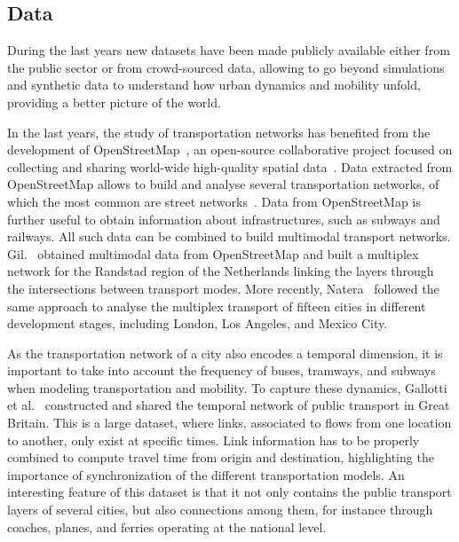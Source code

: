 \subsection{Data}
During the last years new datasets have been made publicly available either from the public sector or from crowd-sourced data, allowing to go beyond simulations and synthetic data to understand how urban dynamics and mobility unfold, providing a better picture of the world.

In the last years, the study of transportation networks has benefited from the development of OpenStreetMap~\cite{OpenStreetMap}, an open-source collaborative project focused on collecting and sharing world-wide high-quality spatial data~\cite{haklay2010openstreetmap,girres2010quality,ferster2019openstreetmap,barbosa2018human}. Data extracted from OpenStreetMap allows to build and analyse several transportation networks, of which the most common are street networks~\cite{boeing2020multiscale,boeing2020world}. Data from OpenStreetMap is further useful to obtain information about infrastructures, such as subways and railways. All such data can be combined to build multimodal transport networks. Gil.~\cite{gil2015multimodal} obtained multimodal data from OpenStreetMap and built a multiplex network for the Randstad region of the Netherlands linking the layers through the intersections between transport modes. More recently, Natera~\cite{natera2019data} followed the same approach to analyse the multiplex transport of fifteen cities in different development stages, including London, Los Angeles, and Mexico City.

As the transportation network of a city also encodes a temporal dimension, it is important to take into account the frequency of buses, tramways, and subways when modeling transportation and mobility. To capture these dynamics, Gallotti et al.~\cite{gallotti2015temporal} constructed and shared the temporal network of public transport in Great Britain. This is a large dataset, where links, associated to flows from one location to another, only exist at specific times. Link information has to be properly combined to compute travel time from origin and destination, highlighting the importance of synchronization of the different transportation models. An interesting feature of this dataset is that it not only contains the public transport layers of several cities, but also connections among them, for instance through coaches, planes, and ferries operating at the national level.

